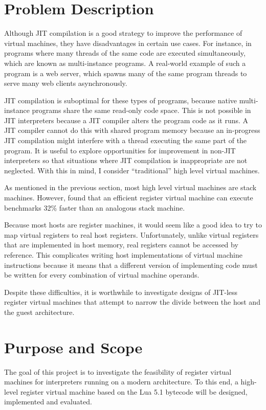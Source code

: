 	\section{Problem Description}
		Although JIT compilation is a good strategy to improve the performance of virtual machines, they have disadvantages in certain use cases. For instance, in programs where many threads of the same code are executed simultaneously, which are known as multi-instance programs. A real-world example of such a program is a web server, which spawns many of the same program threads to serve many web clients asynchronously.
		
		JIT compilation is suboptimal for these types of programs, because native multi-instance programs share the same read-only code space. This is not possible in JIT interpreters because a JIT compiler alters the program code as it runs. A JIT compiler cannot do this with shared program memory because an in-progress JIT compilation might interfere with a thread executing the same part of the program. It is useful to explore opportunities for improvement in non-JIT interpreters so that situations where JIT compilation is inappropriate are not neglected. With this in mind, I consider ``traditional'' high level virtual machines.
		
		As mentioned in the previous section, most high level virtual machines are stack machines. However, \cite{stackregistershowdown} found that an efficient register virtual machine can execute benchmarks 32\% faster than an analogous stack machine. 
		
		Because most hosts are register machines, it would seem like a good idea to try to map virtual registers to real host registers. Unfortunately, unlike virtual registers that are implemented in host memory, real registers cannot be accessed by reference.  This complicates writing host implementations of virtual machine instructions because it means that a different version of implementing code must be written for every combination of virtual machine operands.
		
		Despite these difficulties, it is worthwhile to investigate designs of JIT-less register virtual machines that attempt to narrow the divide between the host and the guest architecture.
	
	\section{Purpose and Scope}
		The goal of this project is to investigate the feasibility of register virtual machines for interpreters running on a modern architecture. To this end, a high-level register virtual machine based on the Lua 5.1 bytecode will be designed, implemented and evaluated.
	
